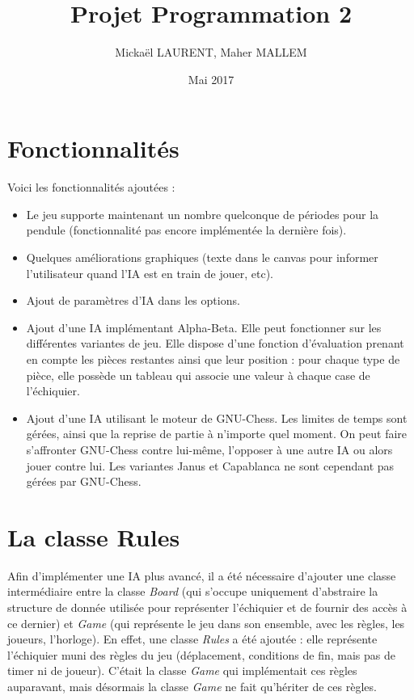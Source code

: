 \documentclass[11pt]{article}
\title{Projet Programmation 2}
\author{Mickaël LAURENT, Maher MALLEM}
\date{Mai 2017}
\begin{document}
\renewcommand{\labelitemi}{-}
\maketitle

\section{Fonctionnalités}

Voici les fonctionnalités ajoutées :\newline
\begin{itemize}
\item Le jeu supporte maintenant un nombre quelconque de périodes pour la pendule (fonctionnalité pas encore implémentée la dernière fois).
\item Quelques améliorations graphiques (texte dans le canvas pour informer l'utilisateur quand l'IA est en train de jouer, etc).
\item Ajout de paramètres d'IA dans les options.
\item Ajout d'une IA implémentant Alpha-Beta. Elle peut fonctionner sur les différentes variantes de jeu. Elle dispose d'une fonction d'évaluation prenant en compte les pièces restantes ainsi que leur position : pour chaque type de pièce, elle possède un tableau qui associe une valeur à chaque case de l'échiquier.
\item Ajout d'une IA utilisant le moteur de GNU-Chess. Les limites de temps sont gérées, ainsi que la reprise de partie à n'importe quel moment. On peut faire s'affronter GNU-Chess contre lui-même, l'opposer à une autre IA ou alors jouer contre lui. Les variantes Janus et Capablanca ne sont cependant pas gérées par GNU-Chess.
\end{itemize}

\section{La classe Rules}
Afin d'implémenter une IA plus avancé, il a été nécessaire d'ajouter une classe intermédiaire entre la classe \textit{Board} (qui s'occupe uniquement d'abstraire la structure de donnée utilisée pour représenter l'échiquier et de fournir des accès à ce dernier) et \textit{Game} (qui représente le jeu dans son ensemble, avec les règles, les joueurs, l'horloge). En effet, une classe \textit{Rules} a été ajoutée : elle représente l'échiquier muni des règles du jeu (déplacement, conditions de fin, mais pas de timer ni de joueur). C'était la classe \textit{Game} qui implémentait ces règles auparavant, mais désormais la classe \textit{Game} ne fait qu'hériter de ces règles. 
\end{document}
